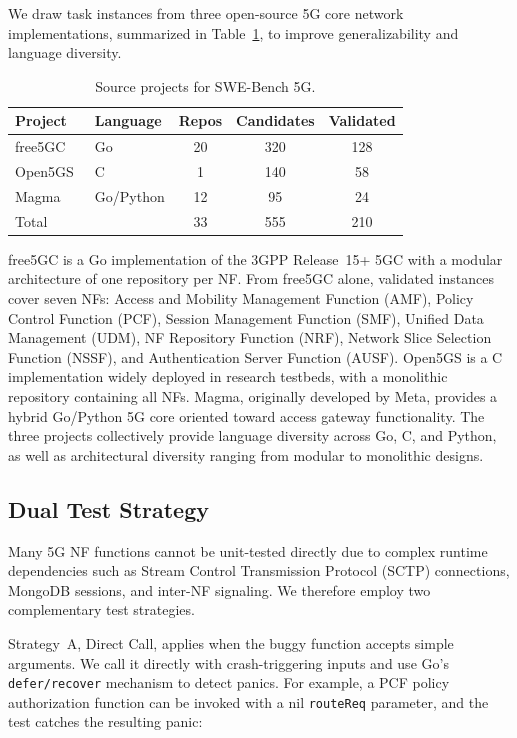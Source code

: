 \documentclass[10pt,conference]{IEEEtran}
\begin{document}
We draw task instances from three open-source 5G core network implementations, summarized in Table~\ref{tab:sources}, to improve generalizability and language diversity.

\begin{table}[t]
\centering
\caption{Source projects for SWE-Bench 5G.}
\label{tab:sources}
\begin{tabular}{@{}llccc@{}}
\toprule
Project & Language & Repos & Candidates & Validated \\
\midrule
free5GC~\cite{free5gc}   & Go   & 20 & 320 & 128 \\
Open5GS~\cite{open5gs}   & C    & 1  & 140 & 58  \\
Magma~\cite{magma}        & Go/Python & 12 & 95 & 24 \\
\midrule
Total                     &      & 33 & 555 & 210 \\
\bottomrule
\end{tabular}
\end{table}

free5GC is a Go implementation of the 3GPP Release~15+ 5GC with a modular architecture of one repository per NF. From free5GC alone, validated instances cover seven NFs: Access and Mobility Management Function (AMF), Policy Control Function (PCF), Session Management Function (SMF), Unified Data Management (UDM), NF Repository Function (NRF), Network Slice Selection Function (NSSF), and Authentication Server Function (AUSF). Open5GS is a C implementation widely deployed in research testbeds, with a monolithic repository containing all NFs. Magma, originally developed by Meta, provides a hybrid Go/Python 5G core oriented toward access gateway functionality. The three projects collectively provide language diversity across Go, C, and Python, as well as architectural diversity ranging from modular to monolithic designs.

\subsection{Dual Test Strategy}

Many 5G NF functions cannot be unit-tested directly due to complex runtime dependencies such as Stream Control Transmission Protocol (SCTP) connections, MongoDB sessions, and inter-NF signaling. We therefore employ two complementary test strategies.

Strategy~A, Direct Call, applies when the buggy function accepts simple arguments. We call it directly with crash-triggering inputs and use Go's \texttt{defer/recover} mechanism to detect panics. For example, a PCF policy authorization function can be invoked with a nil \texttt{routeReq} parameter, and the test catches the resulting panic:
\end{document}
